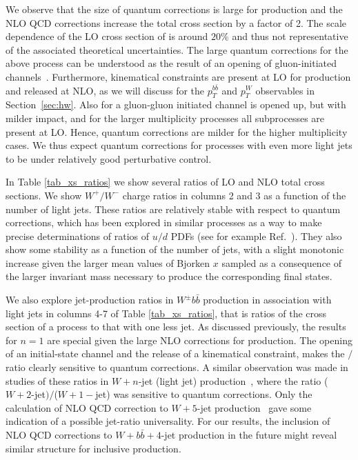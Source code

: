 We observe that the size of quantum corrections is large for \Wbb{} production and the NLO QCD corrections increase the total cross section by a factor of 2. The scale dependence of the LO cross section of \Wbb{} is around $20\%$ and thus not representative of the associated theoretical
uncertainties. The large quantum corrections for the above process can
be understood as the result of an opening of gluon-initiated
channels~\cite{Ellis:1998fv,FebresCordero:2006sj,Cordero:2009kv}. Furthermore, kinematical constraints are present at LO for
\Wbb{} production and released at NLO, as we will discuss for the $p_T^{b\bar b}$ and
$p_T^W$ observables in Section~\ref{sec:hw}. Also for \Wbbnj[1]{} a gluon-gluon initiated channel is opened
up, but with milder impact, and for the larger multiplicity processes all
subprocesses are present at LO. Hence, quantum corrections are milder
for the higher multiplicity cases. We thus expect quantum
corrections for processes with even more light jets to be under relatively
good perturbative control.


In Table \ref{tab_xs_ratios} we show several ratios of LO and NLO
total cross sections. We show $W^+/W^-$ charge
ratios in columns 2 and 3 as a function of the number of light
jets. These ratios are relatively stable with respect to quantum corrections, which has been explored in similar
processes as a way to make precise determinations of ratios of $u/d$ PDFs (see
for example Ref.~\cite{Kom:2010mv}). They also show some stability as a function
of the number of jets, with a slight monotonic increase given the larger mean
values of Bjorken $x$ sampled as a consequence of the larger invariant mass necessary to
produce the corresponding final states.

We also explore jet-production ratios in $W^\pm
b\bar b$ production in association with light jets in columns 4-7 of Table
\ref{tab_xs_ratios}, that is ratios of the cross section of a process to that with one less jet. As discussed previously, the results for $n=1$ are special
given the large NLO corrections for \Wbb{} production. The opening of an initial-state channel and the release of a kinematical constraint, makes the
\Wbbnj[1]{}$/$\Wbb{} ratio clearly sensitive to quantum
corrections.  A similar observation was made in studies of these ratios in $W+n$-jet (light
jet) production~\cite{BH:Wratios}, where the ratio ($W+2$-jet$)/$($W+1-$jet) was sensitive to quantum corrections. Only the calculation of NLO QCD
correction to $W+5$-jet production~\cite{BH:W5j} gave some indication of a possible jet-ratio universality. For our results, the inclusion of NLO QCD corrections to
$W+b\bar b+4$-jet production in the future might reveal similar structure for inclusive \Wbb{} production.



